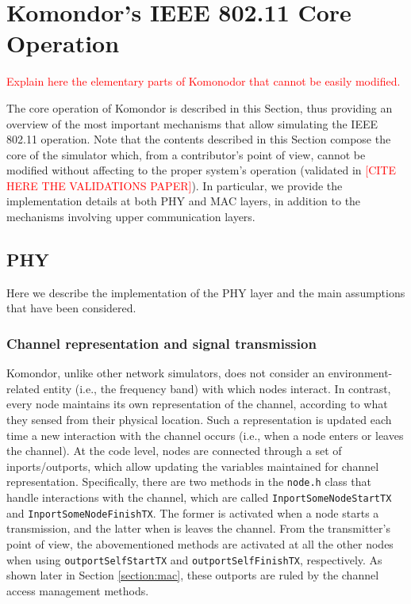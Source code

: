 \documentclass[a4paper]{article}
\begin{document}
\section{Komondor's IEEE 802.11 Core Operation}
\label{section:core_operation}
\textcolor{red}{Explain here the elementary parts of Komonodor that cannot be easily modified.}

The core operation of Komondor is described in this Section, thus providing an overview of the most important mechanisms that allow simulating the IEEE 802.11 operation. Note that the contents described in this Section compose the core of the simulator which, from a contributor's point of view, cannot be modified without affecting to the proper system's operation (validated in \textcolor{red}{[CITE HERE THE VALIDATIONS PAPER]}). In particular, we provide the implementation details at both PHY and MAC layers, in addition to the mechanisms involving upper communication layers.

\subsection{PHY}
\label{section:phy}
Here we describe the implementation of the PHY layer and the main assumptions that have been considered.
	
	\subsubsection{Channel representation and signal transmission}	
	Komondor, unlike other network simulators, does not consider an environment-related entity (i.e., the frequency band) with which nodes interact. In contrast, every node maintains its own representation of the channel, according to what they sensed from their physical location. Such a representation is updated each time a new interaction with the channel occurs (i.e., when a node enters or leaves the channel). At the code level, nodes are connected through a set of inports/outports, which allow updating the variables maintained for channel representation. Specifically, there are two methods in the \texttt{node.h} class that handle interactions with the channel, which are called \texttt{InportSomeNodeStartTX} and \texttt{InportSomeNodeFinishTX}. The former is activated when a node starts a transmission, and the latter when is leaves the channel. From the transmitter's point of view, the abovementioned methods are activated at all the other nodes when using \texttt{outportSelfStartTX} and \texttt{outportSelfFinishTX}, respectively. As shown later in Section \ref{section:mac}, these outports are ruled by the channel access management methods.
	
\end{document}
